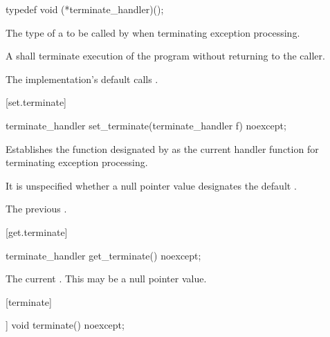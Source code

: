 %
\begin{itemdecl}
typedef void (*terminate_handler)();
\end{itemdecl}

\begin{itemdescr}
\pnum
The type of a
to be called by
%
when terminating exception processing.

\pnum
\required
A  shall
terminate execution of the program without returning to the caller.

\pnum
{}
The implementation's default  calls
.%
\end{itemdescr}

[set.terminate]{}

%
\begin{itemdecl}
terminate_handler set_terminate(terminate_handler f) noexcept;
\end{itemdecl}

\begin{itemdescr}
\pnum
\effects
Establishes the function designated by  as the current
handler function for terminating exception processing.

\pnum
\remarks It is unspecified whether a null pointer value designates the default
.

\pnum
\returns
The previous .
\end{itemdescr}

[get.terminate]{}

\begin{itemdecl}
terminate_handler get_terminate() noexcept;
\end{itemdecl}

\begin{itemdescr}
\pnum
\returns The current .
\enternote This may be a null pointer value. \exitnote
\end{itemdescr}

[terminate]{}

%
\begin{itemdecl}
[[noreturn]] void terminate() noexcept;
\end{itemdecl}

